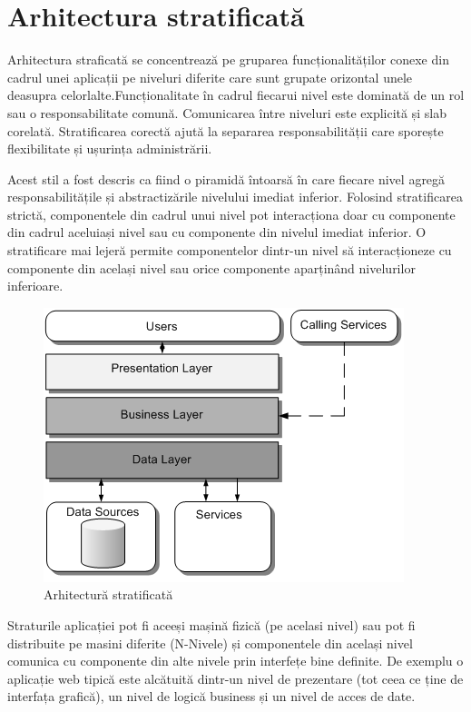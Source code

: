 \documentclass[12pt, a4paper, oneside, romanian]{teza-upb}
\begin{document}
\section{Arhitectura stratificată}

Arhitectura straficată se concentrează pe gruparea funcționalităților conexe din cadrul unei aplicații pe niveluri diferite care sunt grupate orizontal unele deasupra celorlalte.Funcționalitate în cadrul fiecarui nivel este dominată de un rol sau o responsabilitate comună. Comunicarea între niveluri este explicită și slab corelată. Stratificarea corectă ajută la separarea responsabilității care sporește flexibilitate și ușurința administrării.

Acest stil a fost descris ca fiind o piramidă întoarsă în care fiecare nivel agregă responsabilitățile și abstractizările nivelului imediat inferior. Folosind stratificarea strictă, componentele din cadrul unui nivel pot interacționa doar cu componente din cadrul aceluiași nivel sau cu componente din nivelul imediat inferior. O stratificare mai lejeră permite componentelor dintr-un nivel să interacționeze cu componente din același nivel sau orice componente aparținând nivelurilor inferioare.

\begin{figure}[ht]
\centering
\includegraphics[scale=0.5]{img/layered-arch.PNG}
\caption{Arhitectură stratificată}
\label{fig:arhi_stratificata}
\end{figure}

Straturile aplicației pot fi aceeși mașină fizică (pe acelasi nivel) sau pot fi distribuite pe masini diferite (N-Nivele) și componentele din același nivel comunica cu componente din alte nivele prin interfețe bine definite. De exemplu o aplicație web tipică este alcătuită dintr-un nivel de prezentare (tot ceea ce ține de interfața grafică), un nivel de logică business și un nivel de acces de date. 
\end{document}
